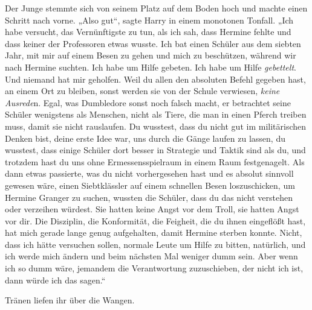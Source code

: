 {Der Junge stemmte sich von seinem Platz auf dem Boden hoch und machte einen Schritt nach vorne. „Also gut“, sagte Harry in einem monotonen Tonfall. „Ich habe versucht, das Vernünftigste zu tun, als ich sah, dass Hermine fehlte und dass keiner der Professoren etwas wusste. Ich bat einen Schüler aus dem siebten Jahr, mit mir auf einem Besen zu gehen und mich zu beschützen, während wir nach Hermine suchten. Ich habe um Hilfe gebeten. Ich habe um Hilfe \emph{gebettelt}. Und niemand hat mir geholfen. Weil du allen den absoluten Befehl gegeben hast, an einem Ort zu bleiben, sonst werden sie von der Schule verwiesen, \emph{keine Ausrede}n. Egal, was Dumbledore sonst noch falsch macht, er betrachtet seine Schüler wenigstens als Menschen, nicht als Tiere, die man in einen Pferch treiben muss, damit sie nicht rauslaufen. Du wusstest, dass du nicht gut im militärischen Denken bist, deine erste Idee war, uns durch die Gänge laufen zu lassen, du wusstest, dass einige Schüler dort besser in Strategie und Taktik sind als du, und trotzdem hast du uns ohne Ermessensspielraum in einem Raum festgenagelt. Als dann etwas passierte, was du nicht vorhergesehen hast und es absolut sinnvoll gewesen wäre, einen Siebtklässler auf einem schnellen Besen loszuschicken, um Hermine Granger zu suchen, wussten die Schüler, dass du das nicht verstehen oder verzeihen würdest. Sie hatten keine Angst vor dem Troll, sie hatten Angst vor dir. Die Disziplin, die Konformität, die Feigheit, die du ihnen eingeflößt hast, hat mich gerade lange genug aufgehalten, damit Hermine sterben konnte. Nicht, dass ich hätte versuchen sollen, normale Leute um Hilfe zu bitten, natürlich, und ich werde mich ändern und beim nächsten Mal weniger dumm sein. Aber wenn ich so dumm wäre, jemandem die Verantwortung zuzuschieben, der nicht ich ist, dann würde ich das sagen.“

Tränen liefen ihr über die Wangen.

}
